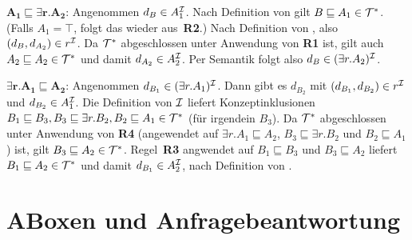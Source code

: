 \documentclass[fontsize=11pt, twoside=false, numbers=autoenddot]{scrbook}
\begin{document}
\smallskip\noindent
$\mathbf{A_1\sqsubseteq \exists r.A_2}$: Angenommen $d_B\in A_1^\mathcal{I}$.
Nach Definition von \Imc gilt $B\sqsubseteq A_1\in \mathcal{T}^*$. (Falls
$A_1=\top$, folgt das wieder aus~\textbf{\textsf{R2}}.) Nach
Definition von \Imc, also $(d_B,d_{A_2})\in r^\mathcal{I}$. 
Da $\mathcal{T}^*$ abgeschlossen unter Anwendung
von \textbf{\textsf{R1}} ist, gilt auch $A_2\sqsubseteq A_2\in
\mathcal{T}^*$ und damit $d_{A_2}\in A_2^\mathcal{I}$. Per Semantik folgt also $d_B\in (\exists r.A_2)^\mathcal{I}$.

\smallskip\noindent $\mathbf{\exists r.A_1\sqsubseteq A_2}$:
Angenommen $d_{B_1}\in (\exists r.A_1)^\mathcal{I}$. Dann gibt es $d_{B_2}$
mit $(d_{B_1},d_{B_2})\in r^\mathcal{I}$ und $d_{B_2}\in A_1^\mathcal{I}$. Die
Definition von $\mathcal{I}$ liefert Konzeptinklusionen $B_1\sqsubseteq B_3,
B_3\sqsubseteq \exists r.B_2, B_2\sqsubseteq A_1\in \mathcal{T}^*$ (für
irgendein $B_3$). Da $\mathcal{T}^*$ abgeschlossen unter Anwendung
von \textbf{\textsf{R4}} (angewendet auf $\exists r.A_1\sqsubseteq
A_2$, $B_3\sqsubseteq \exists r.B_2$ und $B_2\sqsubseteq A_1$) ist,
gilt $B_3\sqsubseteq A_2\in \mathcal{T}^*$. Regel~\textbf{\textsf{R3}}
angwendet auf $B_1\sqsubseteq B_3$ und $B_3\sqsubseteq A_2$ liefert
$B_1\sqsubseteq A_2\in \mathcal{T}^*$ und damit $d_{B_1}\in A_2^\mathcal{I}$, nach
Definition von \Imc.



\part{ABoxen und Anfragebeantwortung}


%

\pagebreak
{}


\end{document}
